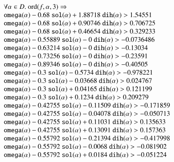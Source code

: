 $$
\begin{array}{lll}
\leftalign\\
\forall\alpha\in D. \ \op{ord}(f,\alpha,3) \Rightarrow \\
   \optt{omega}(\alpha) - 0.68\ \optt{sol}(\alpha) + 1.88718\ \optt{dih}(\alpha) > 1.54551 \\
   \optt{omega}(\alpha) - 0.68\ \optt{sol}(\alpha) + 0.90746\ \optt{dih}(\alpha) > 0.706725\\
   \optt{omega}(\alpha) - 0.68\ \optt{sol}(\alpha) + 0.46654\ \optt{dih}(\alpha) > 0.329233\\
   \optt{omega}(\alpha) - 0.55889\ \optt{sol}(\alpha) - 0\ \optt{dih}(\alpha) > -0.0736486\\
   \optt{omega}(\alpha) - 0.63214\ \optt{sol}(\alpha) - 0\ \optt{dih}(\alpha) > -0.13034\\
   \optt{omega}(\alpha) - 0.73256\ \optt{sol}(\alpha) - 0\ \optt{dih}(\alpha) > -0.23591\\
   \optt{omega}(\alpha) - 0.89346\ \optt{sol}(\alpha) - 0\ \optt{dih}(\alpha) > -0.40505\\
   \optt{omega}(\alpha) - 0.3\ \optt{sol}(\alpha) - 0.5734\ \optt{dih}(\alpha) > -0.978221\\
   \optt{omega}(\alpha) - 0.3\ \optt{sol}(\alpha) - 0.03668\ \optt{dih}(\alpha) > 0.024767\\
   \optt{omega}(\alpha) - 0.3\ \optt{sol}(\alpha) + 0.04165\ \optt{dih}(\alpha) > 0.121199\\
   \optt{omega}(\alpha) - 0.3\ \optt{sol}(\alpha) + 0.1234\ \optt{dih}(\alpha) > 0.209279\\
   \optt{omega}(\alpha) - 0.42755\ \optt{sol}(\alpha) - 0.11509\ \optt{dih}(\alpha) > -0.171859\\
   \optt{omega}(\alpha) - 0.42755\ \optt{sol}(\alpha) - 0.04078\ \optt{dih}(\alpha) > -0.050713\\
   \optt{omega}(\alpha) - 0.42755\ \optt{sol}(\alpha) + 0.11031\ \optt{dih}(\alpha) > 0.135633\\
   \optt{omega}(\alpha) - 0.42755\ \optt{sol}(\alpha) + 0.13091\ \optt{dih}(\alpha) > 0.157363\\
   \optt{omega}(\alpha) - 0.55792\ \optt{sol}(\alpha) - 0.21394\ \optt{dih}(\alpha) > -0.417998\\
   \optt{omega}(\alpha) - 0.55792\ \optt{sol}(\alpha) - 0.0068\ \optt{dih}(\alpha) > -0.081902\\
   \optt{omega}(\alpha) - 0.55792\ \optt{sol}(\alpha) + 0.0184\ \optt{dih}(\alpha) > -0.051224\\

\end{array}$$
